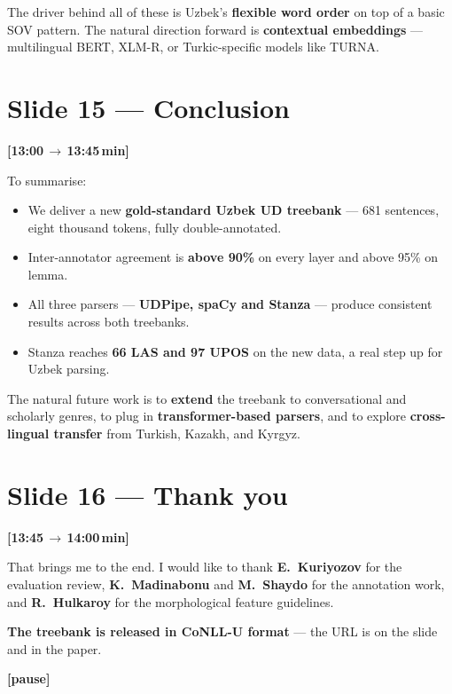 \documentclass[12pt,a4paper]{article}
\newcommand{\timing}[2]{%
   \par\noindent\textbf{\small [#1\,$\to$\,#2\,min]}\par\vspace{0.2em}}
\newcommand{\say}[1]{\textbf{#1}}
\newcommand{\pause}{\par\vspace{0.4em}\textbf{[pause]}\par}
\begin{document}
\noindent
The driver behind all of these is Uzbek's \textbf{flexible word order} on
top of a basic SOV pattern. The natural direction forward is
\textbf{contextual embeddings} — multilingual BERT, XLM-R, or Turkic-specific
models like TURNA.

\section*{Slide 15 — Conclusion}
\timing{13:00}{13:45}

To summarise:

\begin{itemize}
   \item We deliver a new \textbf{gold-standard Uzbek UD treebank} — 681 sentences, eight thousand tokens, fully double-annotated.
   \item Inter-annotator agreement is \textbf{above 90\%} on every layer and above 95\% on lemma.
   \item All three parsers — \textbf{UDPipe, spaCy and Stanza} — produce consistent results across both treebanks.
   \item Stanza reaches \textbf{66 LAS and 97 UPOS} on the new data, a real step up for Uzbek parsing.
\end{itemize}

\noindent
The natural future work is to \textbf{extend} the treebank to conversational
and scholarly genres, to plug in \textbf{transformer-based parsers}, and to
explore \textbf{cross-lingual transfer} from Turkish, Kazakh, and Kyrgyz.

\section*{Slide 16 — Thank you}
\timing{13:45}{14:00}

That brings me to the end. I would like to thank \textbf{E.~Kuriyozov} for the
evaluation review, \textbf{K.~Madinabonu} and \textbf{M.~Shaydo} for the annotation
work, and \textbf{R.~Hulkaroy} for the morphological feature guidelines.

\say{The treebank is released in CoNLL-U format} — the URL is on the slide
and in the paper.

\pause
\end{document}
